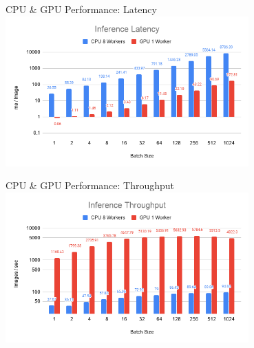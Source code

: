 \begin{frame}{CPU \& GPU Performance: Latency}
	\centering
	\includegraphics[width=0.7\textwidth]{../Images/Results/CPU-GPU-Inference-Latency.png}\\
\end{frame}

\begin{frame}{CPU \& GPU Performance: Throughput}
	\centering
	\includegraphics[width=0.7\textwidth]{../Images/Results/CPU-GPU-Inference-Throughput.png}\\
\end{frame}

